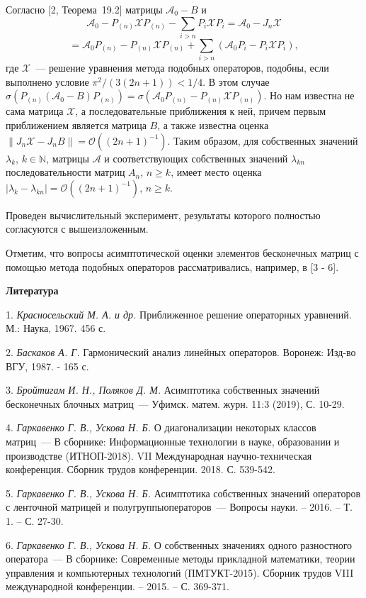 Согласно [2, Теорема~19.2] матрицы $\mathcal{A}_0-B$ и
$$
\mathcal{A}_0 - P_{(n)}\mathcal{X}P_{(n)}-\sum_{i>n}P_i\mathcal{X}P_i=\mathcal{A}_0-J_n\mathcal{X}
$$
$$
= \mathcal{A}_0P_{(n)}-P_{(n)}\mathcal{X}P_{(n)}+\sum_{i>n}(\mathcal{A}_0P_i-P_i\mathcal{X}P_i),
$$
где $\mathcal{X}$~--- решение уравнения метода подобных
операторов, подобны, если выполнено условие $\pi^2/(3(2n+1))<1/4$. В этом случае $\sigma(P_{(n)}(\mathcal{A}_0-B)P_{(n)})=
\sigma(\mathcal{A}_0P_{(n)}-P_{(n)}\mathcal{X}P_{(n)})$. Но нам известна не сама
матрица $\mathcal{X}$, а последовательные приближения к ней, причем первым приближением является матрица $B$, а также известна
оценка $\|J_n\mathcal{X}-J_nB\|=\mathcal{O}((2n+1)^{-1})$. Таким образом, для собственных значений $\lambda_k$, $k\in\mathbb{N}$,
матрицы $\mathcal{A}$ и соответствующих собственных значений $\lambda_{kn}$ последовательности матриц $A_n$, $n\geqslant k$,
имеет место оценка $|\lambda_k-\lambda_{kn}|=\mathcal{O}((2n+1)^{-1})$, $n\geqslant k$.

Проведен вычислительный эксперимент, результаты которого полностью согласуются с вышеизложенным.

Отметим, что вопросы асимптотической оценки элементов бесконечных матриц с помощью метода подобных операторов рассматривались,
например, в [3 - 6].


\smallskip \centerline {\bf Литература} \nopagebreak

1. {\it Красносельский М. А. и др.} Приближенное решение операторных уравнений. М.: Наука, 1967. 456 с.

2. {\it Баскаков А. Г.} Гармонический анализ линейных операторов. Воронеж: Изд-во ВГУ, 1987. - 165 с.

3. {\it Бройтигам И. Н., Поляков Д. М.} Асимптотика собственных значений бесконечных блочных матриц~--- Уфимск. матем. журн. 11:3
(2019), С. 10-29.

4. {\it Гаркавенко Г. В., Ускова Н. Б.} О диагонализации некоторых классов матриц~--- В сборнике: Информационные технологии в науке, образовании и производстве (ИТНОП-2018). VII Международная научно-техническая конференция. Сборник трудов конференции. 2018. С. 539-542.

5. {\it Гаркавенко Г. В., Ускова Н. Б.} Асимптотика собственных значений операторов с ленточной матрицей и полугруппыоператоров~---
Вопросы науки. -- 2016. -- Т. 1. -- С. 27-30.

6. {\it Гаркавенко Г. В., Ускова Н. Б.}  О собственных значениях одного разностного оператора~---
В сборнике: Современные методы прикладной математики, теории управления и компьютерных технологий (ПМТУКТ-2015). Сборник трудов VIII международной конференции. -- 2015. -- С. 369-371.

